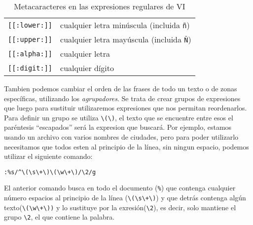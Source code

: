 \begin{table}[htbp]
\centering
\begin{tabular}{|c|l|}
\hline
{\tt \verb.[[:lower:]].} & cualquier letra minúscula (incluida {\tt ñ}) \\
{\tt \verb.[[:upper:]].} & cualquier letra mayúscula (incluida {\tt Ñ}) \\
{\tt \verb.[[:alpha:]].} & cualquier letra \\
{\tt \verb.[[:digit:]].} & cualquier dígito \\
\hline
\end{tabular}
\caption{Metacaracteres en las expresiones regulares de VI}
\end{table}

Tambien   podemos   cambiar  el   orden   de   las  frases   de   todo
un   texto    o   de   zonas   específicas,    utilizando   los   {\em
agrupadores}. Se trata de
crear  grupos de  expresiones  que luego  para sustituir  utilizaremos
expresiones  que  nos permitan  reordenarlos.  Para  definir un  grupo
se  utiliza \verb.\(\).,  el  texto  que se  encuentre  entre esos  el
paréntesis ``escapados''  será la expresion que  buscará. Por ejemplo,
estamos usando  un archivo con  varios nombres de ciudades,  pero para
poder utilizarlo necesitamos que todos esten al principio de la línea,
sin ningun espacio, podemos utilizar el siguiente comando:

\begin{verbatim}
:%s/^\(\s\+\)\(\w\+\)/\2/g
\end{verbatim}

El anterior comando busca en todo el documento (\verb.%.) que contenga
cualquier número espacios al principio de la línea (\verb.\(\s\+\).) y
que detrás contenga algún texto(\verb.\(\w\+\)). y lo sustituye por la
exresión(\verb.\2.), es  decir, solo  mantiene el grupo  \verb.\2., el
que contiene la palabra.

